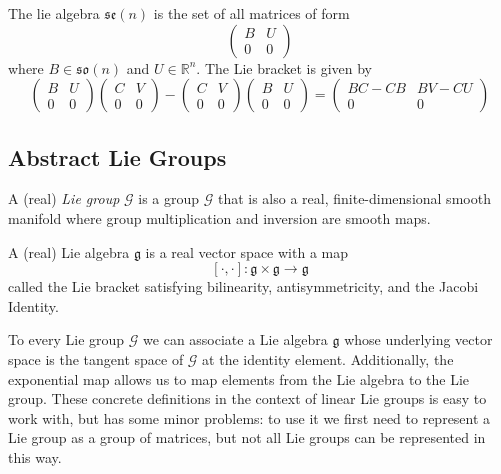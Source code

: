 \documentclass{article}
\begin{document}
      \begin{example}
      The lie algebra $\mathfrak{se}(n)$ is the set of all matrices of form 
      \[\begin{pmatrix}
      B & U \\ 0 & 0
      \end{pmatrix}\]
      where $B \in \mathfrak{so}(n)$ and $U \in \mathbb{R}^n$. The Lie bracket is given by
      \[\begin{pmatrix}
      B & U \\ 0 & 0
      \end{pmatrix} \begin{pmatrix}
      C & V \\ 0 & 0
      \end{pmatrix} - \begin{pmatrix}
      C & V \\ 0 & 0
      \end{pmatrix} \begin{pmatrix}
      B & U \\ 0 & 0
      \end{pmatrix} = \begin{pmatrix}
      BC - CB & BV - CU \\ 0 & 0
      \end{pmatrix}\]
      \end{example}

  \subsection{Abstract Lie Groups}

    \begin{definition}
    A (real) \textit{Lie group} $\mathcal{G}$ is a group $\mathcal{G}$ that is also a real, finite-dimensional smooth manifold where  group multiplication and inversion are smooth maps. 
    \end{definition}


    \begin{definition}
    A (real) Lie algebra $\mathfrak{g}$ is a real vector space with a map 
    \[[\cdot, \cdot]: \mathfrak{g} \times \mathfrak{g} \longrightarrow \mathfrak{g}\]
    called the Lie bracket satisfying bilinearity, antisymmetricity, and the Jacobi Identity. 
    \end{definition}

    To every Lie group $\mathcal{G}$ we can associate a Lie algebra $\mathfrak{g}$ whose underlying vector space is the tangent space of $\mathcal{G}$ at the identity element. Additionally, the exponential map allows us to map elements from the Lie algebra to the Lie group. These concrete definitions in the context of linear Lie groups is easy to work with, but has some minor problems: to use it we first need to represent a Lie group as a group of matrices, but not all Lie groups can be represented in this way. 
\end{document}
